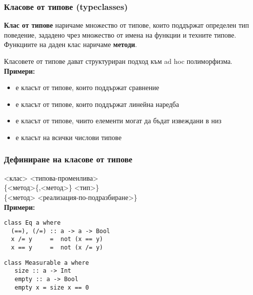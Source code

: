 \documentclass[alsotrans]{beamerswitch}
\begin{document}
\begin{frame}
  \frametitle{Класове от типове (typeclasses)}

  \begin{definition}
    \textbf{Клас от типове} наричаме множество от типове, които поддържат определен тип поведение, зададено чрез множество от имена на функции и техните типове. \pause Функциите на даден клас наричаме \textbf{методи}.
  \end{definition}
  \pause
  Класовете от типове дават структуриран подход към ad hoc полиморфизма.\\
  \pause
  \textbf{Примери:}
  \begin{itemize}[<+->]
  \item {} е класът от типове, които поддържат сравнение
  \item {} е класът от типове, които поддържат линейна наредба
  \item {} е класът от типове, чиито елементи могат да бъдат
    извеждани в низ
  \item {} е класът на всички числови типове
  \end{itemize}
\end{frame}

\begin{frame}[fragile]
  \frametitle{Дефиниране на класове от типове}
   <клас> <типова-променлива>\\
  \hspace{2ex}\{<метод>\{,<метод>\} \tta{::} <тип>\}\\
  \hspace{2ex}\{<метод> \tta{=} <реализация-по-подразбиране>\}\\[2em]
  \pause
  \textbf{Примери:}\\
\begin{lstlisting}
class Eq a where
  (==), (/=) :: a -> a -> Bool
  x /= y     =  not (x == y)
  x == y     =  not (x /= y)
\end{lstlisting}
\pause
\begin{lstlisting}
class Measurable a where
   size :: a -> Int
   empty :: a -> Bool
   empty x = size x == 0
\end{lstlisting}
\end{frame}
\end{document}
